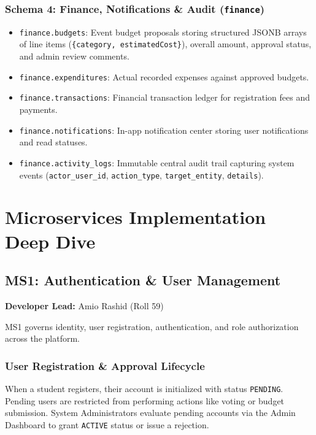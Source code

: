 \documentclass[12pt, a4paper]{report}
\begin{document}
\subsection{Schema 4: Finance, Notifications \& Audit (\texttt{finance})}
\begin{itemize}
    \item \texttt{finance.budgets}: Event budget proposals storing structured JSONB arrays of line items (\texttt{\{category, estimatedCost\}}), overall amount, approval status, and admin review comments.
    \item \texttt{finance.expenditures}: Actual recorded expenses against approved budgets.
    \item \texttt{finance.transactions}: Financial transaction ledger for registration fees and payments.
    \item \texttt{finance.notifications}: In-app notification center storing user notifications and read statuses.
    \item \texttt{finance.activity\_logs}: Immutable central audit trail capturing system events (\texttt{actor\_user\_id}, \texttt{action\_type}, \texttt{target\_entity}, \texttt{details}).
\end{itemize}

\chapter{Microservices Implementation Deep Dive}

\section{MS1: Authentication \& User Management}
\textbf{Developer Lead:} Amio Rashid (Roll 59)

MS1 governs identity, user registration, authentication, and role authorization across the platform.

\subsection{User Registration \& Approval Lifecycle}
When a student registers, their account is initialized with status \texttt{PENDING}. Pending users are restricted from performing actions like voting or budget submission. System Administrators evaluate pending accounts via the Admin Dashboard to grant \texttt{ACTIVE} status or issue a rejection.
\end{document}
